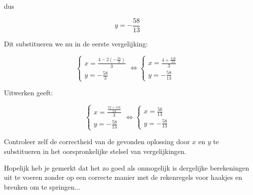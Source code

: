 \begin{voorbeeld}
dus

\[y=-\frac{58}{13} \]

Dit substitueren we nu in de eerste vergelijking:

\[\left\{ \begin{array}{l}
x = \frac{4 - 2(-\frac{58}{3})}{3} \\
y=-\frac{58}{3}
\end{array} \right. \Leftrightarrow \left\{ \begin{array}{l}
x = \frac{4+\frac{116}{13}}{3}\\
y=-\frac{58}{13}
\end{array} \right.\]

Uitwerken geeft:

\[\left\{ \begin{array}{l}
x = \frac{\frac{52+116}{13}}{3} \\
y=-\frac{58}{13}
\end{array} \right. \Leftrightarrow \left\{ \begin{array}{l}
x = \frac{56}{13}\\
y=-\frac{58}{13}
\end{array} \right.\]

Controleer zelf de correctheid van de gevonden oplossing door $x$ en $y$ te substitueren in het oorspronkelijke stelsel van vergelijkingen.\\

\begin{opmerking}
	Hopelijk heb je gemerkt dat het zo goed als onmogelijk is dergelijke berekeningen uit te voeren zonder op een correcte manier met de rekenregels voor haakjes en breuken om te springen...
\end{opmerking}

\end{voorbeeld}

